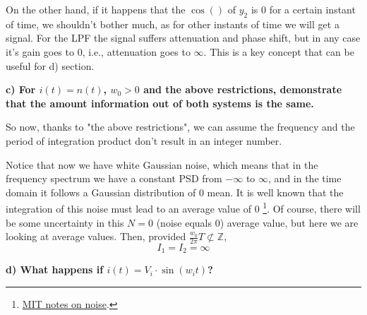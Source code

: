 \noindent On the other hand, if it happens that the $\cos()$ of $y_2$ is $0$ for a certain instant of time, we shouldn't bother much, as for other instants of time we will get a signal. For the LPF the signal suffers attenuation and phase shift, but in any case it's gain goes to $0$, i.e., attenuation goes to $\infty$. This is a key concept that can be useful for d) section.



\begin{pexbox}{}
    \textbf{c) For $i(t) = n (t)$, $w_0 > 0$ and the above restrictions, demonstrate that the amount information out of both systems is the same.}
\end{pexbox}

\noindent So now, thanks to "the above restrictions", we can assume the frequency and the period of integration product don't result in an integer number. 

\noindent Notice that now we have white Gaussian noise, which means that in the frequency spectrum we have a constant PSD from $-\infty$ to $\infty$, and in the time domain it follows a Gaussian distribution of $0$ mean. It is well known that the integration of this noise must lead to an average value of $0$ \footnote{\href{https://ocw.mit.edu/courses/electrical-engineering-and-computer-science/6-02-introduction-to-eecs-ii-digital-communication-systems-fall-2012/readings/MIT6_02F12_chap09.pdf}{MIT notes on noise}.}. Of course, there will be some uncertainty in this $N=0$ (noise equals $0$) average value, but here we are looking at average values. Then, provided $ \frac{w_0}{2 \pi} T \not\subset \mathbb{Z}$,
\begin{equation}
   \boxed{
      I_1 = I_2 = \infty
   } 
\end{equation}


\begin{pexbox}{}
   \textbf{d) What happens if $i(t) = V_i \cdot \sin(w_i t)$?}
\end{pexbox}

